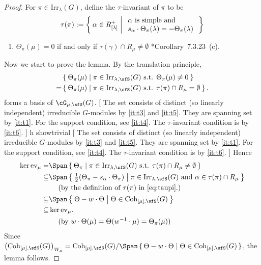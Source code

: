 \documentclass[12pt,a4paper]{amsart}
\newcommand{\trivial}[2][]{\if\relax\detokenize{#1}\relax
  {%
      \color{orange} \vspace{0em} $[$  #2 $]$
      \color{black}
  }
  \else
\ifx#1h
\ifcsname showtrivial\endcsname
{%
    \color{orange} \vspace{0em}  $[$ #2 $]$
    \color{black}
}
\fi
\else {\red Wrong argument!} \fi
\fi
}
\numberwithin{equation}{section}
\theoremstyle{remark}
\def\half{{\tfrac{1}{2}}}
\def\Irr{\mathrm{Irr}}
\def\Coh{\mathrm{Coh}}
\def\ev#1{{\mathrm{ev}_{#1}}}
\begin{document}
\begin{proof}
  For $\pi\in \Irr_{\lambda}(G)$, define the $\tau$-invariant of $\pi$ to be
  \begin{equation}\label{eq:taupi}
    \tau(\pi) := \Set{\alpha\in R^{+}_{[\lambda]}|
      \begin{array}{l}
        \text{$\alpha$ is simple and }\\
        s_{\alpha}\cdot \Theta_{\pi}(\lambda) = -\Theta_{\pi}(\lambda)
      \end{array}
    }
  \end{equation}
  \begin{enumerate}[resume*]
    \item
          \label{it:t6}
          $\Theta_{\pi}(\mu) =0$ if and only if
          $\tau(\gamma)\cap R_\mu \neq \emptyset$
          \cite{Vg}*{Corollary~7.3.23~(c)}.
  \end{enumerate}

  Now we start to prove the lemma. By the translation principle,
  \[
    \begin{split}
      & \Set{\Theta_{\pi}(\mu)| \pi\in \Irr_{\lambda, \sfS}(G)
        \text{ s.t. } \Theta_{\pi}(\mu)\neq 0} \\
      = & \Set{\Theta_{\pi}(\mu)| \pi\in \Irr_{\lambda, \sfS}(G) \text{ s.t.
        } \tau(\pi)\cap R_{\mu}= \emptyset}.
    \end{split}
  \]
  forms a basis of $\Grt_{\mu,\sfS}(G)$. \trivial{ The set consists of distinct
    (so linearly independent) irreducible $G$-modules by \ref{it:t3} and
    \ref{it:t5}. They are spanning set by \ref{it:t1}. For the support
    condition, see \ref{it:t4}. The $\tau$-invariant condition is by
    \ref{it:t6}.
  } Hence
  \[
    \begin{split}
      \ker \ev{\mu} = & \Span \Set{\Theta_{\pi}| \pi\in \Irr_{\lambda, \sfS}(G) \text{
          s.t. }
        \tau(\pi)\cap R_{\mu}\neq \emptyset}\\
      \subseteq & \Span \Set{\half(\Theta_\pi - s_{\alpha}\cdot \Theta_{\pi}) | \pi\in \Irr_{\lambda, \sfS}(G) \text{
          and } \alpha \in
        \tau(\pi)\cap R_{\mu}}\\
      & \ \ \ \  \text{(by the definition of $\tau(\pi)$ in \eqref{eq:taupi}.)} \\
      \subseteq &\Span\Set{\Theta- w\cdot \Theta |\Theta\in \Coh_{[\mu],\sfS}(G)} \\
      \subseteq & \ker \ev{\mu}. \\
      &\ \ \ \ \text{(by
        $w\cdot \Theta(\mu) = \Theta(w^{-1}\cdot \mu)=\Theta_\pi(\mu)$)}
    \end{split}
  \]
  Since
  $\left(\Coh_{[\mu],\sfS}(G)\right)_{W_{\mu}} =\Coh_{[\mu],\sfS}(G)\slash \Span\set{\Theta- w\cdot \Theta |\Theta\in \Coh_{[\mu],\sfS}(G)} $,
  the lemma follows.
\end{proof}
\end{document}
